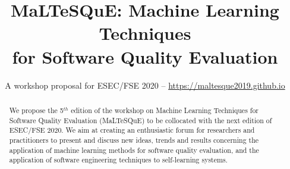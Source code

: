 \documentclass[sigconf, final]{acmart}
\begin{document}
\title{MaLTeSQuE: Machine Learning Techniques\\for Software Quality Evaluation}
\subtitle{A workshop proposal for ESEC/FSE 2020 -- \url{https://maltesque2019.github.io}}



\begin{abstract}
We propose the 5$^{th}$ edition of the workshop on Machine Learning Techniques for Software Quality Evaluation (MaLTeSQuE) to be collocated with the next edition of ESEC/FSE 2020.
We aim at creating an enthusiastic forum for researchers and practitioners to present and discuss new ideas, trends and results concerning the application of machine learning methods for software quality evaluation, and the application of software engineering techniques to self-learning systems.
\end{abstract}


\maketitle








\balance

	
\end{document}
